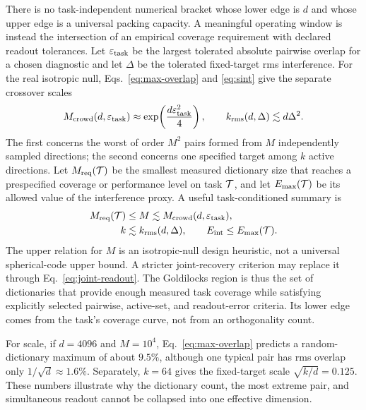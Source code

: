 \documentclass[
  aps,
  reprint,
  superscriptaddress,
  floatfix,
  nofootinbib,
  longbibliography
]{revtex4-2}
\newcommand{\Msem}{M}
\newcommand{\Eint}{E_{\mathrm{int}}}
\begin{document}
There is no task-independent numerical bracket whose lower edge is $d$ and
whose upper edge is a universal packing capacity.  A meaningful operating
window is instead the intersection of an empirical coverage requirement with
declared readout tolerances.  Let $\varepsilon_{\rm task}$ be the largest
tolerated absolute pairwise overlap for a chosen diagnostic and let $\Delta$ be the
tolerated fixed-target rms interference.  For the real isotropic null,
Eqs.~\eqref{eq:max-overlap} and \eqref{eq:sint} give the separate crossover
scales
\begin{equation}
\label{eq:dual}
M_{\rm crowd}(d,\varepsilon_{\rm task})
\approx
\exp\!\left(\frac{d\varepsilon_{\rm task}^2}{4}\right),
\qquad
k_{\rm rms}(d,\Delta)
\lesssim d\Delta^2.
\end{equation}
The first concerns the worst of order $\Msem^2$ pairs formed from $\Msem$
independently sampled directions; the second concerns one specified target
among $k$ active directions.
Let $M_{\rm req}({\cal T})$ be the smallest measured dictionary size that
reaches a prespecified coverage or performance level on task ${\cal T}$, and
let $E_{\max}({\cal T})$ be its allowed value of the interference proxy.  A
useful task-conditioned summary is
\begin{equation}
\label{eq:gold-task}
\begin{aligned}
M_{\rm req}({\cal T})&\leq \Msem
\lesssim M_{\rm crowd}(d,\varepsilon_{\rm task}),\\
k&\lesssim k_{\rm rms}(d,\Delta),
\qquad \Eint\leq E_{\max}({\cal T}).
\end{aligned}
\end{equation}
The upper relation for $\Msem$ is an isotropic-null design heuristic, not a
universal spherical-code upper bound.  A stricter joint-recovery criterion may
replace it through Eq.~\eqref{eq:joint-readout}.  The Goldilocks region is thus
the set of dictionaries that provide enough measured task coverage while
satisfying explicitly selected pairwise, active-set, and readout-error
criteria.  Its lower edge comes from the task's coverage curve, not from an
orthogonality count.

For scale, if $d=4096$ and $\Msem=10^4$, Eq.~\eqref{eq:max-overlap} predicts a
random-dictionary maximum of about $9.5\%$, although one typical pair has rms
overlap only $1/\sqrt d\approx1.6\%$.  Separately, $k=64$ gives the
fixed-target scale $\sqrt{k/d}=0.125$.  These numbers illustrate why the
dictionary count, the most extreme pair, and simultaneous readout cannot be
collapsed into one effective dimension.
\end{document}
